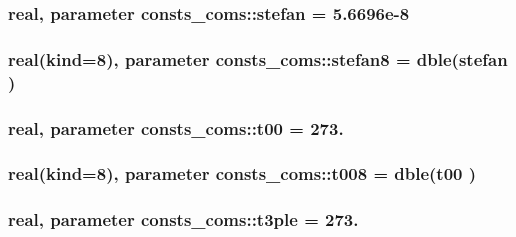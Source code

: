 \subsubsection[{\texorpdfstring{stefan}{stefan}}]{\setlength{\rightskip}{0pt plus 5cm}real, parameter consts\+\_\+coms\+::stefan = 5.\+6696e-\/8}\hypertarget{namespaceconsts__coms_af216e24a2bb718d85f4e5501f586634e}{}\label{namespaceconsts__coms_af216e24a2bb718d85f4e5501f586634e}
\subsubsection[{\texorpdfstring{stefan8}{stefan8}}]{\setlength{\rightskip}{0pt plus 5cm}real(kind=8), parameter consts\+\_\+coms\+::stefan8 = dble({\bf stefan} )}\hypertarget{namespaceconsts__coms_a5f113af284d2f76449a49c827db77373}{}\label{namespaceconsts__coms_a5f113af284d2f76449a49c827db77373}
\subsubsection[{\texorpdfstring{t00}{t00}}]{\setlength{\rightskip}{0pt plus 5cm}real, parameter consts\+\_\+coms\+::t00 = 273.}\hypertarget{namespaceconsts__coms_afbc98a1338166b05d3a2d997c7b27259}{}\label{namespaceconsts__coms_afbc98a1338166b05d3a2d997c7b27259}
\subsubsection[{\texorpdfstring{t008}{t008}}]{\setlength{\rightskip}{0pt plus 5cm}real(kind=8), parameter consts\+\_\+coms\+::t008 = dble({\bf t00} )}\hypertarget{namespaceconsts__coms_acba5e51574aed080f17d371bbcd3cb34}{}\label{namespaceconsts__coms_acba5e51574aed080f17d371bbcd3cb34}
\subsubsection[{\texorpdfstring{t3ple}{t3ple}}]{\setlength{\rightskip}{0pt plus 5cm}real, parameter consts\+\_\+coms\+::t3ple = 273.}\hypertarget{namespaceconsts__coms_aed2b23708875a89de5f372ecc4299dd4}{}\label{namespaceconsts__coms_aed2b23708875a89de5f372ecc4299dd4}
